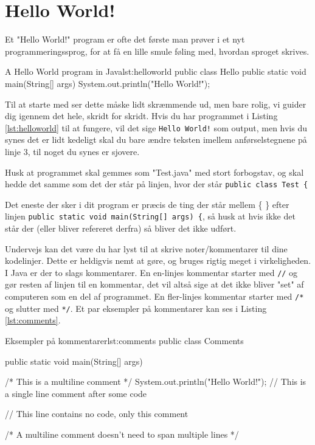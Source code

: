 \section{Hello World!}
Et "Hello World!" program er ofte det første man prøver i et nyt programmeringssprog, for at få en lille smule føling med, hvordan sproget skrives.

\begin{JavaCode}{A Hello World program in Java}{lst:helloworld}
	public class Hello {
		public static void main(String[] args) {
			System.out.println("Hello World!");
		}
	}
\end{JavaCode}

Til at starte med ser dette måske lidt skræmmende ud, men bare rolig, vi guider dig igennem det hele, skridt for skridt. Hvis du har programmet i Listing \ref{lst:helloworld} til at fungere, vil det sige \texttt{Hello World!} som output, men hvis du synes det er lidt kedeligt skal du bare ændre teksten imellem anførselstegnene på linje 3, til noget du synes er sjovere.

\begin{remark}
	Husk at programmet skal gemmes som "Test.java" med stort forbogstav, og skal hedde det samme som det der står på linjen, hvor der står \texttt{public class Test \{}
\end{remark}

Det eneste der sker i dit program er præcis de ting der står mellem \{ \} efter linjen \texttt{public static void main(String[] args) \{}, så husk at hvis ikke det står der (eller bliver refereret derfra) så bliver det ikke udført.

\begin{remark}
	Undervejs kan det være du har lyst til at skrive noter/kommentarer til dine kodelinjer. Dette er heldigvis nemt at gøre, og bruges rigtig meget i virkeligheden. I Java er der to slags kommentarer. En en-linjes kommentar starter med \texttt{//} og gør resten af linjen til en kommentar, det vil altså sige at det ikke bliver "set" af computeren som en del af programmet. En fler-linjes kommentar starter med \texttt{/*} og slutter med \texttt{*/}. Et par eksempler på kommentarer kan ses i Listing \ref{lst:comments}.
\end{remark}

\begin{JavaCode}{Eksempler på kommentarer}{lst:comments}
	public class Comments {
		public static void main(String[] args) {
			/*
			This 
			is
			a 
			multiline 
			comment
			*/
			System.out.println("Hello World!");	// This is a single line comment after some code
			
			// This line contains no code, only this comment
			
			/* A multiline comment doesn't need to span multiple lines */
		}
	}
\end{JavaCode}

